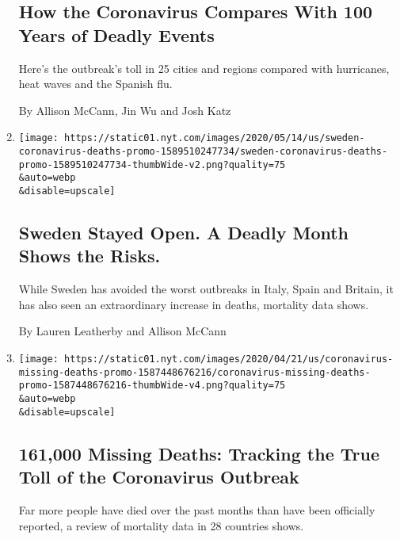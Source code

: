 \begin{enumerate}
  \hypertarget{how-the-coronavirus-compares-with-100-years-of-deadly-events}{%
  \subsection{How the Coronavirus Compares With 100 Years of Deadly
  Events}\label{how-the-coronavirus-compares-with-100-years-of-deadly-events}}

  Here's the outbreak's toll in 25 cities and regions compared with
  hurricanes, heat waves and the Spanish flu.

  By Allison McCann, Jin Wu and Josh Katz
\item
  \href{/interactive/2020/05/15/world/europe/sweden-coronavirus-deaths.html}{}

  \texttt{[image: https://static01.nyt.com/images/2020/05/14/us/sweden-coronavirus-deaths-promo-1589510247734/sweden-coronavirus-deaths-promo-1589510247734-thumbWide-v2.png?quality=75\\\&auto=webp\\\&disable=upscale]}

  \hypertarget{sweden-stayed-open-a-deadly-month-shows-the-risks}{%
  \subsection{Sweden Stayed Open. A Deadly Month Shows the
  Risks.}\label{sweden-stayed-open-a-deadly-month-shows-the-risks}}

  While Sweden has avoided the worst outbreaks in Italy, Spain and
  Britain, it has also seen an extraordinary increase in deaths,
  mortality data shows.

  By Lauren Leatherby and Allison McCann
\item
  \href{/interactive/2020/04/21/world/coronavirus-missing-deaths.html}{}

  \texttt{[image: https://static01.nyt.com/images/2020/04/21/us/coronavirus-missing-deaths-promo-1587448676216/coronavirus-missing-deaths-promo-1587448676216-thumbWide-v4.png?quality=75\\\&auto=webp\\\&disable=upscale]}

  \hypertarget{161000-missing-deaths-tracking-the-true-toll-of-the-coronavirus-outbreak}{%
  \subsection{161,000 Missing Deaths: Tracking the True Toll of the
  Coronavirus
  Outbreak}\label{161000-missing-deaths-tracking-the-true-toll-of-the-coronavirus-outbreak}}

  Far more people have died over the past months than have been
  officially reported, a review of mortality data in 28 countries shows.


\end{enumerate}
